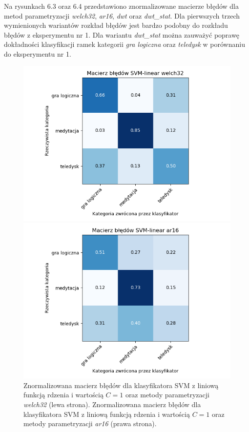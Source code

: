 \documentclass[notitlepage]{report}
\begin{document}
Na rysunkach 6.3 oraz 6.4 przedstawiono znormalizowane macierze błędów dla metod parametryzacji \textit{welch32}, \textit{ar16}, \textit{dwt} oraz \textit{dwt\_stat}. Dla pierwszych trzech wymienionych wariantów rozkład błędów jest bardzo podobny do rozkładu błędów z eksperymentu nr 1. Dla wariantu \textit{dwt\_stat} można zauważyć poprawę dokładności klasyfikacji ramek kategorii \textit{gra logiczna} oraz \textit{teledysk} w porównaniu do eksperymentu nr 1.

\begin{figure}[H]
	\begin{minipage}{0.48\textwidth}
		\centering
		\includegraphics[width=1.3\linewidth]{linear_svm_welch_32_cm2.png}
	\end{minipage}
	\begin{minipage}{0.48\textwidth}
		\centering
		\includegraphics[width=1.3\linewidth]{linear_svm_ar_16_cm2.png}
	\end{minipage}
	\caption{Znormalizowana macierz błędów dla klasyfikatora SVM z liniową funkcją rdzenia i wartością $C=1$ oraz metody parametryzacji \textit{welch32} (lewa strona). Znormalizowana macierz błędów dla klasyfikatora SVM z liniową funkcją rdzenia i wartością $C=1$ oraz metody parametryzacji \textit{ar16} (prawa strona).}
\end{figure}
\end{document}
